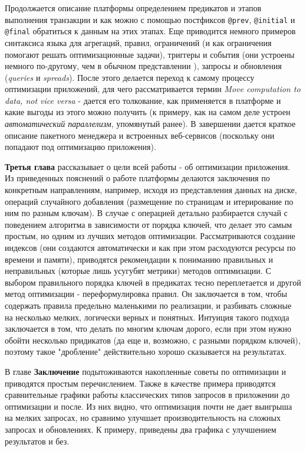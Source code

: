 Продолжается описание платформы определением предикатов и этапов выполнения транзакции и как можно с помощью постфиксов \lstinline{@prev}, \lstinline{@initial} и \lstinline{@final} обратиться к данным на этих этапах. Еще приводится немного примеров синтаксиса языка \logiql для агрегаций, правил, ограничений (и как ограничения помогают решать оптимизационные задачи), триггеры и события (они устроены немного по-другому, чем в обычном представлении \sql), запросы и обновления (\emph{queries} и \emph{spreads}). После этого делается переход к самому процессу оптимизации приложений, для чего рассматривается термин \emph{Move computation to data, not vice versa} - дается его толкование, как применяется в платформе и какие выгоды из этого можно получить (к примеру, как на самом деле устроен \emph{автоматический параллелизм}, упомянутый ранее). В завершении дается краткое описание пакетного менеджера \hydra и встроенных веб-сервисов (поскольку они попадают под оптимизацию приложения).

\textbf{Третья глава} рассказывает о цели всей работы - об оптимизации приложения. Из приведенных пояснений о работе платформы делаются заключения по конкретным направлениям, например, исходя из представления данных на диске, операций случайного добавления (размещение по страницам и итерирование по ним по разным ключам). В случае с операцией \join детально разбирается случай с поведением алгоритма в зависимости от порядка ключей, что делает это самым простым, но одним из лучших методов оптимизации. Рассматриваются создание индексов (они создаются автоматически и как при этом расходуются ресурсы по времени и памяти), приводятся рекомендации к пониманию правильных и неправильных (которые лишь усугубят метрики) методов оптимизации. С выбором правильного порядка ключей в предикатах тесно переплетается и другой метод оптимизации - переформулировка правил. Он заключается в том, чтобы содержать правила предельно маленькими по реализации, и разбивать сложные на несколько мелких, логически верных и понятных. Интуиция такого подхода заключается в том, что делать \join
по многим ключам дорого, если при этом нужно обойти несколько придикатов (да еще и, возможно, с разными порядком ключей), поэтому такое "дробление" действительно хорошо сказывается на результатах.

В главе \textbf{Заключение} подытоживаются накопленные советы по оптимизации и приводятся простым перечислением. Также в качестве примера приводятся сравнительные графики работы классических типов запросов в приложении до оптимизации и после. Из них видно, что оптимизация почти не дает выигрыша на мелких запросах, но сравнимо улучшает производительность на сложных запросах и обновлениях. К примеру, приведены два графика с улучшением результатов и без.

